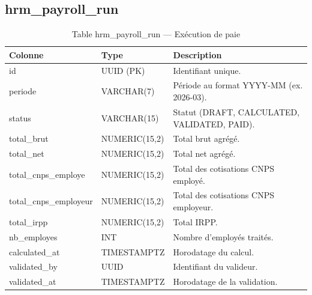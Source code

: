 \documentclass[a4paper,12pt,openany]{book}
\begin{document}
    \subsection{hrm\_payroll\_run}
    \begin{table}[H]
        \centering
        \caption{Table hrm\_payroll\_run — Exécution de paie}
        \begin{tabularx}{\textwidth}{llX}
    \toprule
    \textbf{Colonne} & \textbf{Type} & \textbf{Description} \\
    \midrule
    id                     & UUID (PK)       & Identifiant unique. \\
    periode                & VARCHAR(7)      & Période au format YYYY-MM (ex. 2026-03). \\
    status                 & VARCHAR(15)     & Statut (DRAFT, CALCULATED, VALIDATED, PAID). \\
    total\_brut            & NUMERIC(15,2)   & Total brut agrégé. \\
    total\_net             & NUMERIC(15,2)   & Total net agrégé. \\
    total\_cnps\_employe   & NUMERIC(15,2)   & Total des cotisations CNPS employé. \\
    total\_cnps\_employeur & NUMERIC(15,2)   & Total des cotisations CNPS employeur. \\
    total\_irpp            & NUMERIC(15,2)   & Total IRPP. \\
    nb\_employes           & INT             & Nombre d'employés traités. \\
    calculated\_at         & TIMESTAMPTZ     & Horodatage du calcul. \\
    validated\_by          & UUID            & Identifiant du valideur. \\
    validated\_at          & TIMESTAMPTZ     & Horodatage de la validation. \\
    \bottomrule
        \end{tabularx}
    \end{table}
\end{document}

